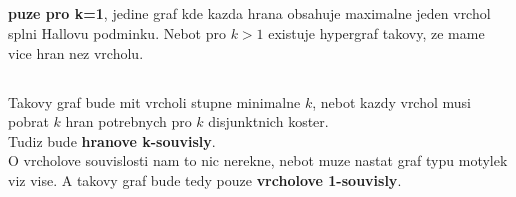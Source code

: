 \documentclass[a4paper]{article}
\begin{document}
\subsection{}
\textbf{puze pro k=1}, jedine graf kde kazda hrana obsahuje maximalne jeden
vrchol splni Hallovu podminku. Nebot pro $k>1$ existuje hypergraf takovy, ze
mame vice hran nez vrcholu.


\subsection{}
Takovy graf bude mit vrcholi stupne minimalne $k$, nebot kazdy vrchol musi
pobrat $k$ hran potrebnych pro $k$ disjunktnich koster.\\
Tudiz bude \textbf{hranove k-souvisly}.\\
O vrcholove souvislosti nam to nic nerekne, nebot muze nastat graf typu motylek
viz vise. A takovy graf bude tedy pouze \textbf{vrcholove 1-souvisly}.
\end{document}

